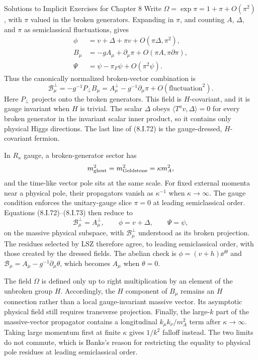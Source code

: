 \begin{bankssolutions}{Solutions to Implicit Exercises for Chapter 8}
Write $\Omega=\exp\pi=1+\pi+O(\pi^2)$, with $\pi$ valued in the broken
generators.  Expanding in $\pi$, and counting $A$, $\Delta$, and $\pi$ as
semiclassical fluctuations, gives
\begin{align*}
 \phi&=v+\Delta+\pi v+O(\pi\Delta,\pi^2),\\
 B_\mu&=-gA_\mu+\partial_\mu\pi+O(\pi A,\pi\partial\pi),\\
 \Psi&=\psi-\pi_F\psi+O(\pi^2\psi). \tag{8.I.72}
\end{align*}
Thus the canonically normalized broken-vector combination is
\[
 \mathcal B_\mu^\perp=-g^{-1}P_\perp B_\mu
 =A_\mu^\perp-g^{-1}\partial_\mu\pi
 +O(\text{fluctuation}^2). \tag{8.I.73}
\]
Here $P_\perp$ projects onto the broken generators.  This field is
$H$-covariant, and it is gauge invariant when $H$ is trivial.  The scalar
$\Delta$ obeys $\langle T^av,\Delta\rangle=0$ for every broken generator in
the invariant scalar inner product, so it contains only physical Higgs
directions.  The last line of (8.I.72) is the gauge-dressed, $H$-covariant
fermion.

In $R_\kappa$ gauge, a broken-generator sector has
\[
 m_{\rm ghost}^2=m_{\rm Goldstone}^2=\kappa m_A^2,
\]
and the time-like vector pole sits at the same scale.  For fixed external
momenta near a physical pole, their propagators vanish as $\kappa^{-1}$ when
$\kappa\to\infty$.  The gauge condition enforces the unitary-gauge slice
$\pi=0$ at leading semiclassical order.  Equations (8.I.72)--(8.I.73) then
reduce to
\[
 \mathcal B_\mu^\perp=A_\mu^\perp,\qquad \phi=v+\Delta,
 \qquad \Psi=\psi,
\]
on the massive physical subspace, with $\mathcal B_\mu^\perp$ understood as its
broken projection.  The residues selected by LSZ therefore agree, to leading
semiclassical order, with those created by the dressed fields.  The abelian
check is
$\phi=(v+h)\ee^{\ii\theta}$ and
$\mathcal B_\mu=A_\mu-g^{-1}\partial_\mu\theta$, which becomes $A_\mu$ when
$\theta=0$.

The field $\Omega$ is defined only up to right multiplication by an element
of the unbroken group $H$.  Accordingly, the $H$ component of $B_\mu$ remains
an $H$ connection rather than a local gauge-invariant massive vector.  Its
asymptotic physical field still requires transverse projection.  Finally, the
large-$k$ part of the massive-vector propagator contains a longitudinal
$k_\mu k_\nu/m_A^2$ term after $\kappa\to\infty$.  Taking large momentum first
at finite $\kappa$ gives $1/k^2$ falloff instead.  The two limits do not
commute, which is Banks's reason for restricting the equality to physical
pole residues at leading semiclassical order.

\end{bankssolutions}
